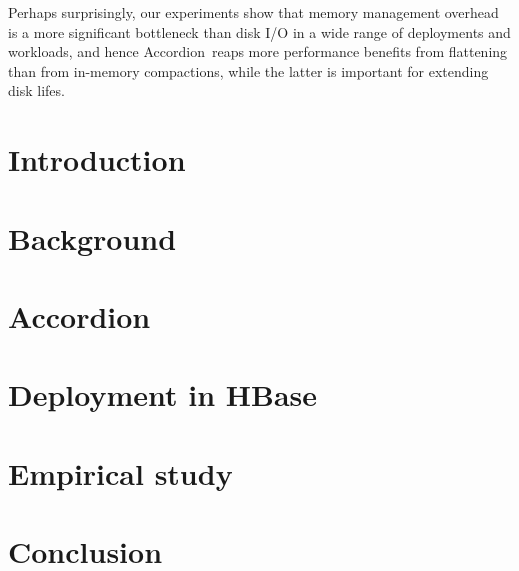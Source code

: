 \documentclass[letterpaper,twocolumn,10pt]{article}
\newcommand{\sys}{Accordion}
\begin{document}
Perhaps surprisingly, our experiments show that memory management overhead is a more significant bottleneck than disk I/O in a
wide range of deployments and workloads, and hence \sys\ reaps more performance benefits from flattening than from in-memory compactions,
while the latter is important for extending disk lifes.


\section{Introduction} \label{sec:intro}
 

\section{Background}\label{sec:bg}
%

\section{\sys} \label{sec:accordion}
 

\section{Deployment in HBase} \label{sec:hbase}

\section{Empirical study} \label{sec:eval}


\section{Conclusion} \label{sec:conclusions}



\newpage




\end{document}
